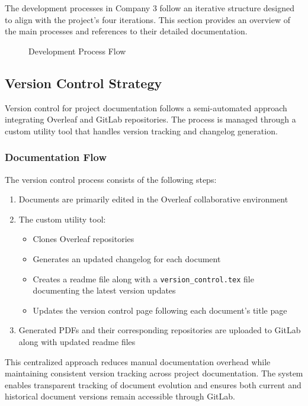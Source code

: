 The development processes in Company 3 follow an iterative structure designed to align with the project's four iterations. This section provides an overview of the main processes and references to their detailed documentation.

\begin{figure}[h]
    \centering
    \caption{Development Process Flow}
    \label{fig:process-flow}
\end{figure}

\subsection*{Version Control Strategy}
Version control for project documentation follows a semi-automated approach integrating Overleaf and GitLab repositories. The process is managed through a custom utility tool that handles version tracking and changelog generation.

\subsubsection*{Documentation Flow}
The version control process consists of the following steps:
\begin{enumerate}
    \item Documents are primarily edited in the Overleaf collaborative environment
    \item The custom utility tool:
    \begin{itemize}
        \item Clones Overleaf repositories
        \item Generates an updated changelog for each document
        \item Creates a readme file along with a \texttt{version\_control.tex} file documenting the latest version updates
        \item Updates the version control page following each document's title page
    \end{itemize}
    \item Generated PDFs and their corresponding repositories are uploaded to GitLab along with updated readme files
\end{enumerate}

This centralized approach reduces manual documentation overhead while maintaining consistent version tracking across project documentation. The system enables transparent tracking of document evolution and ensures both current and historical document versions remain accessible through GitLab.

